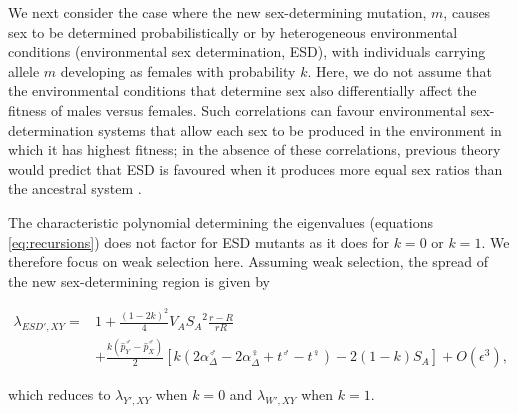 \documentclass[12pt]{article}
\begin{document}
We next consider the case where the new sex-determining mutation, $m$, causes sex to be determined probabilistically or by heterogeneous environmental conditions (environmental sex determination, ESD), with individuals carrying allele $m$ developing as females with probability $k$.
Here, we do not assume that the environmental conditions that determine sex also differentially affect the fitness of males versus females. 
Such correlations can favour environmental sex-determination systems that allow each sex to be produced in the environment in which it has highest fitness; in the absence of these correlations, previous theory would predict that ESD is favoured when it produces more equal sex ratios than the ancestral system \citep[see reviews by][]{Charnov:1982wg,Bull:1983vi,West:2009we}. %

The characteristic polynomial determining the eigenvalues (equations \ref{eq:recursions}) does not factor for ESD mutants as it does for $k=0$ or $k=1$. 
We therefore focus on weak selection here. 
Assuming weak selection, the spread of the new sex-determining region is given by 

\begin{equation}
\begin{split}
\lambda_{ESD',XY} =& 1 + \frac{(1-2k)^2}{4}V_{A}{S_{A}}^2\frac{r-R}{r R} \\
&+\frac{k(\hat{p}^\male_Y-\hat{p}^\male_X)}{2}\left[ k \left(2\alpha_{\Delta}^\male-2\alpha_{\Delta}^\female+t^\male-t^\female \right) -2(1-k)S_{A}\right]+O\left(\epsilon^3\right),
\end{split}
\label{eq:lambda_ESD_k}
\end{equation}

\noindent
which reduces to $\lambda_{Y',XY}$ when $k=0$ and $\lambda_{W',XY}$ when $k=1$. 
\end{document}
